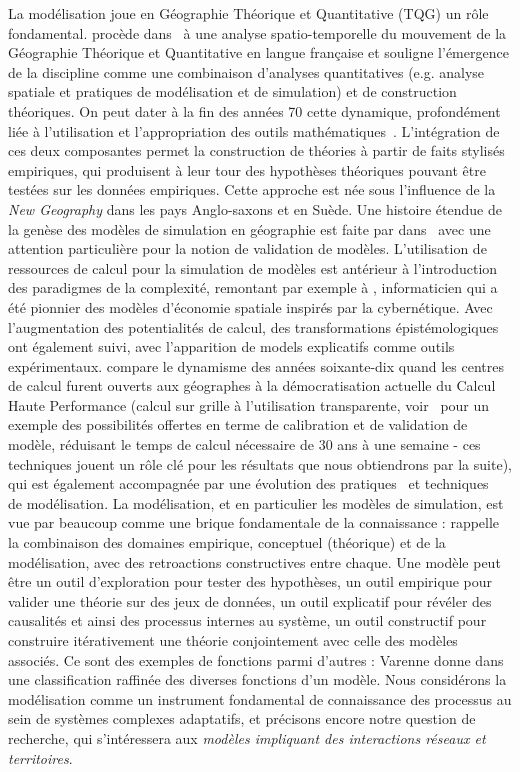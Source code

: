 {}{
La modélisation joue en Géographie Théorique et Quantitative (TQG) un rôle fondamental.  procède dans~\cite{cuyala2014analyse} à une analyse spatio-temporelle du mouvement de la Géographie Théorique et Quantitative en langue française et souligne l'émergence de la discipline comme une combinaison d'analyses quantitatives (e.g. analyse spatiale et pratiques de modélisation et de simulation) et de construction théoriques. On peut dater à la fin des années 70 cette dynamique, profondément liée à l'utilisation et l'appropriation des outils mathématiques~\cite{pumain2002role}. L'intégration de ces deux composantes permet la construction de théories à partir de faits stylisés empiriques, qui produisent à leur tour des hypothèses théoriques pouvant être testées sur les données empiriques. Cette approche est née sous l'influence de la \emph{New Geography} dans les pays Anglo-saxons et en Suède. Une histoire étendue de la genèse des modèles de simulation en géographie est faite par  dans~\cite{rey2015plateforme} avec une attention particulière pour la notion de validation de modèles. L'utilisation de ressources de calcul pour la simulation de modèles est antérieur à l'introduction des paradigmes de la complexité, remontant par exemple à , informaticien qui a été pionnier des modèles d'économie spatiale inspirés par la cybernétique. Avec l'augmentation des potentialités de calcul, des transformations épistémologiques ont également suivi, avec l'apparition de models explicatifs comme outils expérimentaux.  compare le dynamisme des années soixante-dix quand les centres de calcul furent ouverts aux géographes à la démocratisation actuelle du Calcul Haute Performance (calcul sur grille à l'utilisation transparente, voir~\cite{schmitt2014half} pour un exemple des possibilités offertes en terme de calibration et de validation de modèle, réduisant le temps de calcul nécessaire de 30 ans à une semaine - ces techniques jouent un rôle clé pour les résultats que nous obtiendrons par la suite), qui est également accompagnée par une évolution des pratiques~\cite{banos2013pour} et techniques~\cite{10.1371/journal.pone.0138212} de modélisation. La modélisation, et en particulier les modèles de simulation, est vue par beaucoup comme une brique fondamentale de la connaissance : \cite{livet2010} rappelle la combinaison des domaines empirique, conceptuel (théorique) et de la modélisation, avec des retroactions constructives entre chaque. Une modèle peut être un outil d'exploration pour tester des hypothèses, un outil empirique pour valider une théorie sur des jeux de données, un outil explicatif pour révéler des causalités et ainsi des processus internes au système, un outil constructif pour construire itérativement une théorie conjointement avec celle des modèles associés. Ce sont des exemples de fonctions parmi d'autres : Varenne donne dans~\cite{varenne2010simulations} une classification raffinée des diverses fonctions d'un modèle. Nous considérons la modélisation comme un instrument fondamental de connaissance des processus au sein de systèmes complexes adaptatifs, et précisons encore notre question de recherche, qui s'intéressera aux \emph{modèles impliquant des interactions réseaux et territoires}.
}



